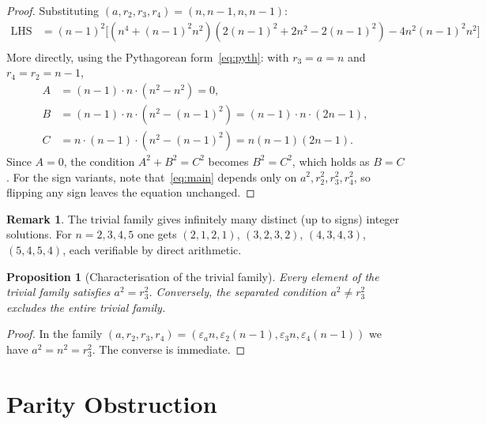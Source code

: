 \documentclass[12pt, a4paper]{article}
\newtheorem{proposition}[theorem]{Proposition}
\theoremstyle{definition}
\newtheorem{remark}[theorem]{Remark}
\begin{document}
\begin{proof}
  Substituting $(a,r_2,r_3,r_4)=(n,n-1,n,n-1)$:
  \begin{align*}
    \text{LHS} &= (n-1)^2\bigl[(n^4+(n-1)^2n^2)(2(n-1)^2+2n^2-2(n-1)^2)
        - 4n^2(n-1)^2n^2\bigr]\\
  \end{align*}
  More directly, using the Pythagorean form~\eqref{eq:pyth}:
  with $r_3 = a = n$ and $r_4 = r_2 = n-1$,
  \begin{align*}
    A &= (n-1)\cdot n\cdot(n^2-n^2) = 0,\\
    B &= (n-1)\cdot n\cdot(n^2-(n-1)^2) = (n-1)\cdot n\cdot(2n-1),\\
    C &= n\cdot(n-1)\cdot(n^2-(n-1)^2) = n(n-1)(2n-1).
  \end{align*}
  Since $A = 0$, the condition $A^2+B^2 = C^2$ becomes $B^2 = C^2$, which holds
  as $B = C$.  For the sign variants, note that~\eqref{eq:main} depends only on
  $a^2, r_2^2, r_3^2, r_4^2$, so flipping any sign leaves the equation unchanged.
\end{proof}

\begin{remark}
  The trivial family gives infinitely many distinct (up to signs) integer
  solutions.  For $n = 2,3,4,5$ one gets $(2,1,2,1)$, $(3,2,3,2)$, $(4,3,4,3)$,
  $(5,4,5,4)$, each verifiable by direct arithmetic.
\end{remark}

\begin{proposition}[Characterisation of the trivial family]\label{prop:triv-char}
  Every element of the trivial family satisfies $a^2 = r_3^2$.  Conversely,
  the separated condition $a^2 \neq r_3^2$ excludes the entire trivial family.
\end{proposition}

\begin{proof}
  In the family $(a,r_2,r_3,r_4)=(\varepsilon_a n,\varepsilon_2(n-1),\varepsilon_3 n,
  \varepsilon_4(n-1))$ we have $a^2 = n^2 = r_3^2$.  The converse is immediate.
\end{proof}

\section{Parity Obstruction}\label{sec:parity}
\end{document}
